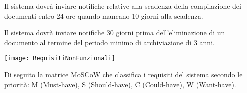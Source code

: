 \documentclass[a4paper]{report}
\begin{document}
Il sistema dovrà inviare notifiche relative alla scadenza della compilazione dei documenti entro 24 ore quando mancano 10 giorni alla scadenza.


Il sistema dovrà inviare notifiche 30 giorni prima dell'eliminazione di un documento al termine del periodo minimo di archiviazione di 3 anni.

\begin{figure*}[ht]
    \centering
    \texttt{[image: RequisitiNonFunzionali]}
\end{figure*}


\clearpage
{}

Di seguito la matrice MoSCoW che classifica i requisiti del sistema secondo le priorità: M (Must-have), S (Should-have), C (Could-have), W (Want-have).
\end{document}
